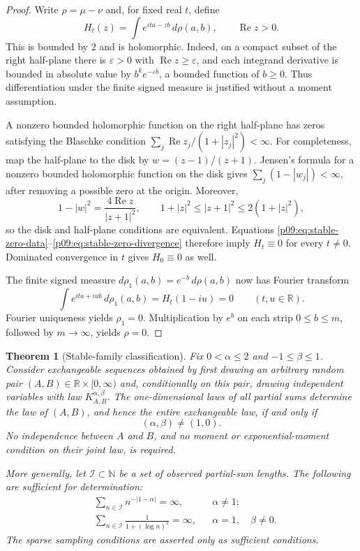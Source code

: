 \documentclass[11pt,letterpaper]{article}
\newtheorem{theorem}{Theorem}[section]
\theoremstyle{definition}
\theoremstyle{remark}
\newcommand{\1}{\mathbf 1}
\begin{document}
\begin{proof}
Write $\rho=\mu-\nu$ and, for fixed real $t$, define
\[
 H_t(z)=\int e^{ita-zb}\,d\rho(a,b),\qquad \operatorname{Re}z>0.
\]
This is bounded by $2$ and is holomorphic.  Indeed, on a compact subset
of the right half-plane there is $\varepsilon>0$ with
$\operatorname{Re}z\geq\varepsilon$, and each integrand derivative is
bounded in absolute value by $b^k e^{-\varepsilon b}$, a bounded function
of $b\geq0$.  Thus differentiation under the finite signed measure is
justified without a moment assumption.

A nonzero bounded holomorphic function on the right half-plane has zeros
satisfying the Blaschke condition
$\sum_j\operatorname{Re}z_j/(1+|z_j|^2)<\infty$.
For completeness, map the half-plane to the disk by
$w=(z-1)/(z+1)$.  Jensen's formula for a nonzero bounded holomorphic
function on the disk gives $\sum_j(1-|w_j|)<\infty$, after removing a
possible zero at the origin.  Moreover,
\[
 1-|w|^2=\frac{4\operatorname{Re}z}{|z+1|^2},\qquad
 1+|z|^2\leq |z+1|^2\leq2(1+|z|^2),
\]
so the disk and half-plane conditions are equivalent.
Equations \eqref{p09:eq:stable-zero-data}--\eqref{p09:eq:stable-zero-divergence}
therefore imply $H_t\equiv0$ for every $t\ne0$.
Dominated convergence in $t$ gives $H_0\equiv0$ as well.

The finite signed measure $d\rho_1(a,b)=e^{-b}\,d\rho(a,b)$ now has
Fourier transform
\[
 \int e^{ita+iub}\,d\rho_1(a,b)=H_t(1-iu)=0
 \qquad(t,u\in\mathbb R).
\]
Fourier uniqueness yields $\rho_1=0$.
Multiplication by $e^b$ on each strip $0\leq b\leq m$, followed by
$m\to\infty$, yields $\rho=0$.
\end{proof}

\begin{theorem}[Stable-family classification]
\label{p09:thm:stable-classification}
Fix $0<\alpha\leq2$ and $-1\leq\beta\leq1$.
Consider exchangeable sequences obtained by first drawing an arbitrary
random pair $(A,B)\in\mathbb R\times[0,\infty)$ and, conditionally on this
pair, drawing independent variables with law $K_{A,B}^{\alpha,\beta}$.
The one-dimensional laws of all partial sums determine the law of $(A,B)$,
and hence the entire exchangeable law, if and only if
\[
                         (\alpha,\beta)\ne(1,0).
\]
No independence between $A$ and $B$, and no moment or exponential-moment
condition on their joint law, is required.

More generally, let $\mathcal I\subset\mathbb N$ be a set of observed
partial-sum lengths.  The following are sufficient for determination:
\begin{align}
 &\sum_{n\in\mathcal I}n^{-|1-\alpha|}=\infty,
       &&\alpha\ne1;\label{p09:eq:stable-sparse-power}\\
 &\sum_{n\in\mathcal I}\frac{1}{1+(\log n)^2}=\infty,
       &&\alpha=1,\quad\beta\ne0.\label{p09:eq:stable-sparse-log}
\end{align}
The sparse sampling conditions are asserted only as sufficient conditions.
\end{theorem}
\end{document}
